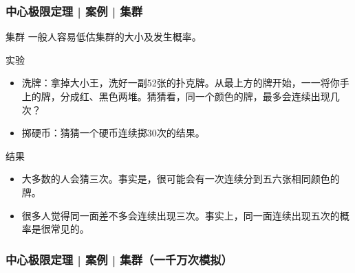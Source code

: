 \begin{frame}
  \frametitle{中心极限定理 | 案例 | 集群}
  \begin{block}{集群}
    一般人容易低估集群的大小及发生概率。
  \end{block}
  \pause
  \begin{block}{实验}
    \begin{itemize}
      \item 洗牌：拿掉大小王，洗好一副52张的扑克牌。从最上方的牌开始，一一将你手上的牌，分成红、黑色两堆。猜猜看，同一个颜色的牌，最多会连续出现几次？
      \item 掷硬币：猜猜一个硬币连续掷30次的结果。
    \end{itemize}
  \end{block}
  \pause \pause \pause \pause
  \begin{block}{结果}
    \begin{itemize}
      \item 大多数的人会猜三次。事实是，很可能会有一次连续分到五六张相同颜色的牌。
      \item 很多人觉得同一面差不多会连续出现三次。事实上，同一面连续出现五次的概率是很常见的。
    \end{itemize}
  \end{block}
\end{frame}

\begin{frame}
  \frametitle{中心极限定理 | 案例 | 集群（一千万次模拟）}
  \vspace{-1em}
\begin{table}[]
\centering
{}
\end{table}
\end{frame}

